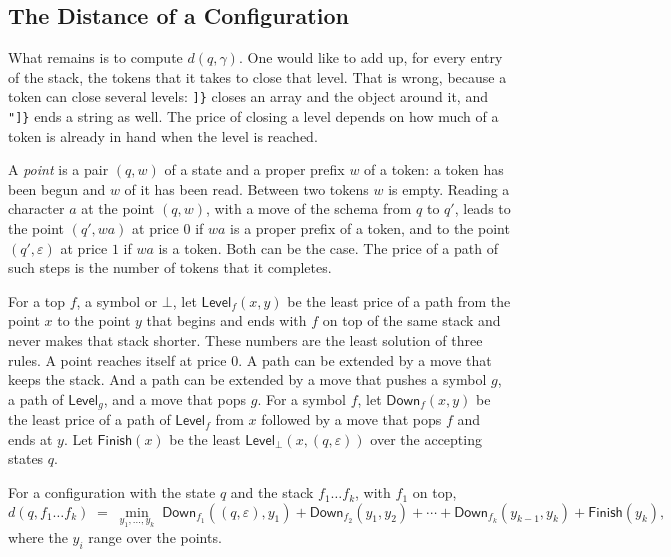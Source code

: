 \documentclass[acmsmall,nonacm,screen]{acmart}
\newcommand{\kw}[1]{\mathsf{#1}}
\newcommand{\str}[1]{\texttt{#1}}
\newcommand{\far}{d}
\newcommand{\Down}{\kw{Down}}
\newcommand{\Level}{\kw{Level}}
\newcommand{\Finish}{\kw{Finish}}
\begin{document}
\subsection{The Distance of a Configuration}

What remains is to compute $\far(q, \gamma)$. One would like to add up, for every entry of
the stack, the tokens that it takes to close that level. That is wrong, because a token can
close several levels: \str{]\}} closes an array and the object around it, and \str{"]\}}
ends a string as well. The price of closing a level depends on how much of a token is
already in hand when the level is reached.

A \emph{point} is a pair $(q, w)$ of a state and a proper prefix $w$ of a token: a token has
been begun and $w$ of it has been read. Between two tokens $w$ is empty. Reading a character
$a$ at the point $(q, w)$, with a move of the schema from $q$ to $q'$, leads to the point
$(q', wa)$ at price $0$ if $wa$ is a proper prefix of a token, and to the point $(q',
\varepsilon)$ at price $1$ if $wa$ is a token. Both can be the case. The price of a path of
such steps is the number of tokens that it completes.

For a top $f$, a symbol or $\bot$, let $\Level_f(x, y)$ be the least price of a path from
the point $x$ to the point $y$ that begins and ends with $f$ on top of the same stack and
never makes that stack shorter. These numbers are the least solution of three rules. A point
reaches itself at price $0$. A path can be extended by a move that keeps the stack. And a
path can be extended by a move that pushes a symbol $g$, a path of $\Level_g$, and a move
that pops $g$. For a symbol $f$, let $\Down_f(x, y)$ be the least price of a path of
$\Level_f$ from $x$ followed by a move that pops $f$ and ends at $y$. Let $\Finish(x)$ be
the least $\Level_\bot(x, (q, \varepsilon))$ over the accepting states $q$.

\begin{theorem}\label{thm:nested}
For a configuration with the state $q$ and the stack $f_1 \ldots f_k$, with $f_1$ on top,
\[
  \far(q, f_1 \ldots f_k) \;=\; \min_{y_1, \ldots, y_k}\;
  \Down_{f_1}((q, \varepsilon), y_1) + \Down_{f_2}(y_1, y_2) + \cdots + \Down_{f_k}(y_{k-1}, y_k)
  + \Finish(y_k),
\]
where the $y_i$ range over the points.
\end{theorem}
\end{document}

